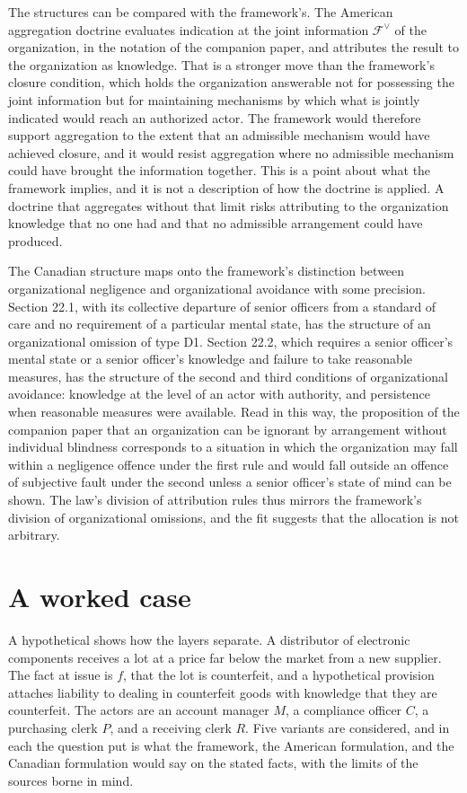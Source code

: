 \documentclass[11pt]{article}
\newcommand{\F}{\mathcal F}
\theoremstyle{plain}
\theoremstyle{definition}
\begin{document}
The structures can be compared with the framework's. The American aggregation doctrine evaluates indication at the joint information $\F^{\vee}$ of the organization, in the notation of the companion paper, and attributes the result to the organization as knowledge. That is a stronger move than the framework's closure condition, which holds the organization answerable not for possessing the joint information but for maintaining mechanisms by which what is jointly indicated would reach an authorized actor. The framework would therefore support aggregation to the extent that an admissible mechanism would have achieved closure, and it would resist aggregation where no admissible mechanism could have brought the information together. This is a point about what the framework implies, and it is not a description of how the doctrine is applied. A doctrine that aggregates without that limit risks attributing to the organization knowledge that no one had and that no admissible arrangement could have produced.

The Canadian structure maps onto the framework's distinction between organizational negligence and organizational avoidance with some precision. Section 22.1, with its collective departure of senior officers from a standard of care and no requirement of a particular mental state, has the structure of an organizational omission of type D1. Section 22.2, which requires a senior officer's mental state or a senior officer's knowledge and failure to take reasonable measures, has the structure of the second and third conditions of organizational avoidance: knowledge at the level of an actor with authority, and persistence when reasonable measures were available. Read in this way, the proposition of the companion paper that an organization can be ignorant by arrangement without individual blindness corresponds to a situation in which the organization may fall within a negligence offence under the first rule and would fall outside an offence of subjective fault under the second unless a senior officer's state of mind can be shown. The law's division of attribution rules thus mirrors the framework's division of organizational omissions, and the fit suggests that the allocation is not arbitrary.

\section{A worked case}

A hypothetical shows how the layers separate. A distributor of electronic components receives a lot at a price far below the market from a new supplier. The fact at issue is $f$, that the lot is counterfeit, and a hypothetical provision attaches liability to dealing in counterfeit goods with knowledge that they are counterfeit. The actors are an account manager $M$, a compliance officer $C$, a purchasing clerk $P$, and a receiving clerk $R$. Five variants are considered, and in each the question put is what the framework, the American formulation, and the Canadian formulation would say on the stated facts, with the limits of the sources borne in mind.
\end{document}
